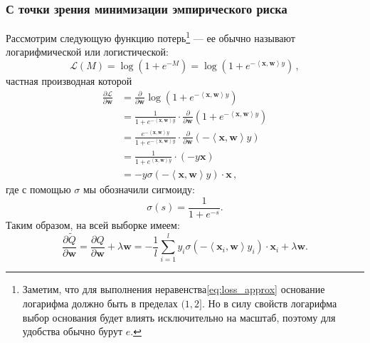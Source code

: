\documentclass[12pt]{article}
\renewcommand{\vec}[1]{\mathbf{#1}}
\newcommand{\pder}[2][]{\frac{\partial#1}{\partial#2}}
\begin{document}
\subsubsection{С точки зрения минимизации эмпирического риска}
Рассмотрим следующую функцию потерь\footnote{Заметим, что для выполнения неравенства\eqref{eq:loss_approx} основание логарифма должно быть в пределах $(1, 2]$. Но в силу свойств логарифма выбор основания будет влиять исключительно на масштаб, поэтому для удобства обычно бурут $e$.} — ее обычно называют логарифмической или логистической:
\begin{equation}
    \label{eq:old_logloss}
    \mathcal{L}(M) = \log{(1+e^{-M})}=
    \log{(1+e^{-\left<\vec{x},\vec{w}\right>y})}\,,
\end{equation}
частная производная которой
\begin{align}
    \pder[\mathcal{L}]{\vec{w}}
    &=\pder{\vec{w}}\log{(1+e^{-\left<\vec{x},\vec{w}\right>y})} \nonumber\\
    &=\frac{1}{1+e^{-\left<\vec{x},\vec{w}\right>y}}\cdot\pder{\vec{w}}(1+e^{-\left<\vec{x},\vec{w}\right>y}) \nonumber\\
    &=\frac{e^{-\left<\vec{x},\vec{w}\right>y}}{1+e^{-\left<\vec{x},\vec{w}\right>y}}\cdot\pder{\vec{w}}(-\left<\vec{x},\vec{w}\right>y) \nonumber\\
    &=\frac{1}{1+e^{\left<\vec{x},\vec{w}\right>y}}\cdot(-y\vec{x}) \nonumber\\
    &= \label{eq:loss_okay}-y \sigma\left(-\left<\vec{x},\vec{w}\right>y\right)\cdot\vec{x}\,,
\end{align}
где с помощью $\sigma$ мы обозначили сигмоиду:
\begin{equation*}
    \sigma{\left(s\right)}=\frac{1}{1+e^{-s}}.
\end{equation*}
Таким образом, на всей выборке имеем:
\begin{equation}
    \label{eq:whole_loss}
    \pder[\widetilde{Q}]{\vec{w}}=
    \pder[{Q}]{\vec{w}} + \lambda{\vec{w}}=-\frac{1}{l}\sum_{i=1}^l y_i \sigma\left(-\left<\vec{x}_i,\vec{w}\right>y_i\right)\cdot\vec{x}_i+\lambda{\vec{w}}.
\end{equation}
\end{document}
